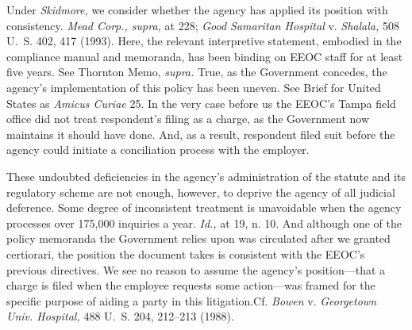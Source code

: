 {  Under \emph{Skidmore,} we consider whether the agency has applied its
position with consistency. \emph{Mead Corp., supra,} at 228; \emph{Good
Samaritan Hospital} v. \emph{Shalala,} 508 U.~S. 402, 417 (1993). Here,
the relevant interpretive statement, embodied in the compliance manual
and memoranda, has been binding on EEOC staff for at least five years.
See Thornton Memo, \emph{supra.} True, as the Government concedes, the
agency's implementation of this policy has been uneven. See Brief
for \newpage  United States as \emph{Amicus Curiae} 25. In the very case
before us the EEOC's Tampa field office did not treat respondent's
filing as a charge, as the Government now maintains it should have done.
And, as a result, respondent filed suit before the agency could initiate
a conciliation process with the employer.

  These undoubted deficiencies in the agency's administration of the
statute and its regulatory scheme are not enough, however, to deprive
the agency of all judicial deference. Some degree of inconsistent
treatment is unavoidable when the agency processes over 175,000
inquiries a year. \emph{Id.,} at 19, n. 10. And although one of the
policy memoranda the Government relies upon was circulated after we
granted certiorari, the position the document takes is consistent
with the EEOC's previous directives. We see no reason to assume the
agency's position---that a charge is filed when the employee requests
some action---was framed for the specific purpose of aiding a party in
this litigation.Cf. \emph{Bowen} v. \emph{Georgetown Univ. Hospital,} 488
U.~S. 204, 212--213 (1988).

}

